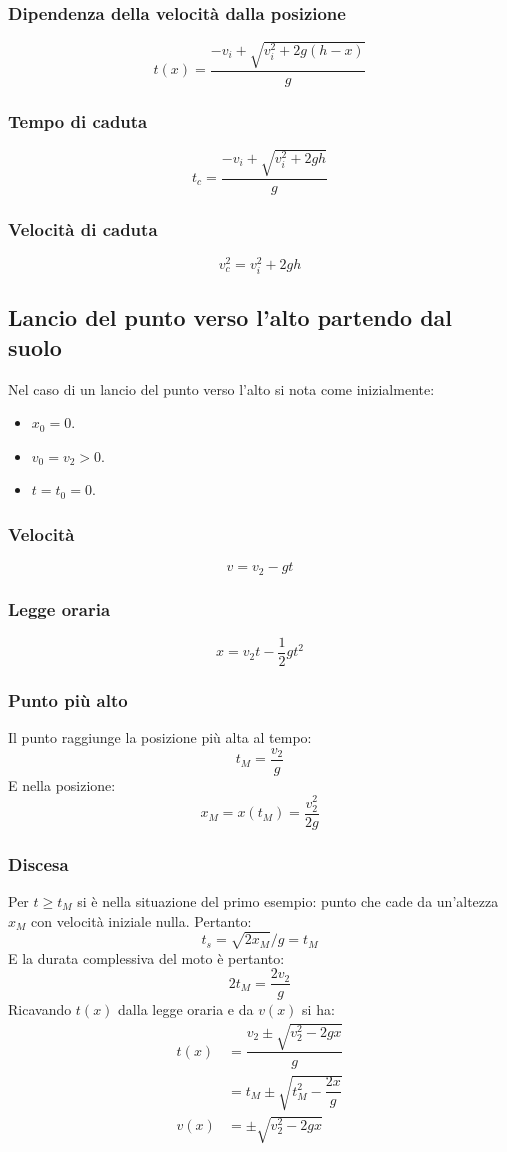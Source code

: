 \documentclass[class=book, crop=false, oneside, 12pt]{standalone}
\begin{document}
		\subsubsection{Dipendenza della velocit\`a dalla posizione}
		$$t(x) = \dfrac{-v_i+\sqrt{v_i^2+2g(h-x)}}{g}$$
		\subsubsection{Tempo di caduta}
		$$t_c = \dfrac{-v_i+\sqrt{v_i^2+2gh}}{g}$$
		\subsubsection{Velocit\`a di caduta}
		$$v_c^2=v_i^2+2gh$$
	\subsection{Lancio del punto verso l'alto partendo dal suolo}
	Nel caso di un lancio del punto verso l'alto si nota come inizialmente:
	\begin{multicols}{3}
		\begin{itemize}
			\item $x_0=0$.
			\item $v_0 = v_2 > 0$.
			\item $t=t_0=0$.
		\end{itemize}
	\end{multicols}
		\subsubsection{Velocit\`a}
		$$v=v_2 - gt$$
		\subsubsection{Legge oraria}
		$$x = v_2t-\dfrac{1}{2}gt^2$$
		\subsubsection{Punto pi\`u alto}
		Il punto raggiunge la posizione pi\`u alta al tempo:
		$$t_M = \dfrac{v_2}{g}$$
		E nella posizione:
		$$x_M=x(t_M)=\dfrac{v_2^2}{2g}$$
		\subsubsection{Discesa}
		Per $t\ge t_M$ si \`e nella situazione del primo esempio: punto che cade da un'altezza $x_M$ con velocit\`a iniziale nulla.
		Pertanto:
		$$t_s = \sqrt{2x_M}/{g}=t_M$$ %
		E la durata complessiva del moto \`e pertanto:
		$$2t_M = \dfrac{2v_2}{g}$$
		Ricavando $t(x)$ dalla legge oraria e da $v(x)$ si ha:
		\begin{align*}
			t(x) &= \dfrac{v_2\pm \sqrt{v_2^2 - 2gx}}{g}\\
			     &= t_M \pm \sqrt{t_M^2 - \dfrac{2x}{g}}\\
			v(x) &= \pm \sqrt{v_2^2 - 2gx}
		\end{align*}
\end{document}
